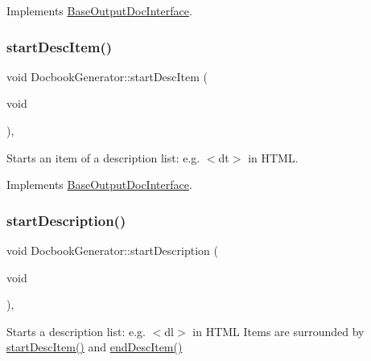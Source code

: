 Implements \mbox{\hyperlink{class_base_output_doc_interface_ab19fc767b08c25b0ca7c976d24799bda}{Base\+Output\+Doc\+Interface}}.

\mbox{\label{class_docbook_generator_a20e9be1323c9378066b4302ec37fa67f}} 
\subsubsection{\texorpdfstring{startDescItem()}{startDescItem()}}
{\footnotesize\ttfamily void Docbook\+Generator\+::start\+Desc\+Item (\begin{DoxyParamCaption}\item[{void}]{ }\end{DoxyParamCaption})\hspace{0.3cm}{\ttfamily [inline]}, {\ttfamily [virtual]}}

Starts an item of a description list\+: e.\+g. {\ttfamily $<$dt$>$} in H\+T\+ML. 

Implements \mbox{\hyperlink{class_base_output_doc_interface_a5d1cc59d94c3f529c90e0a06704be181}{Base\+Output\+Doc\+Interface}}.

\mbox{\label{class_docbook_generator_abca64d577a05a2d49a99edfef8e72e72}} 
\subsubsection{\texorpdfstring{startDescription()}{startDescription()}}
{\footnotesize\ttfamily void Docbook\+Generator\+::start\+Description (\begin{DoxyParamCaption}\item[{void}]{ }\end{DoxyParamCaption})\hspace{0.3cm}{\ttfamily [inline]}, {\ttfamily [virtual]}}

Starts a description list\+: e.\+g. {\ttfamily $<$dl$>$} in H\+T\+ML Items are surrounded by \mbox{\hyperlink{class_docbook_generator_a20e9be1323c9378066b4302ec37fa67f}{start\+Desc\+Item()}} and \mbox{\hyperlink{class_docbook_generator_ae46437543719a73a35d0202749633c15}{end\+Desc\+Item()}} 

